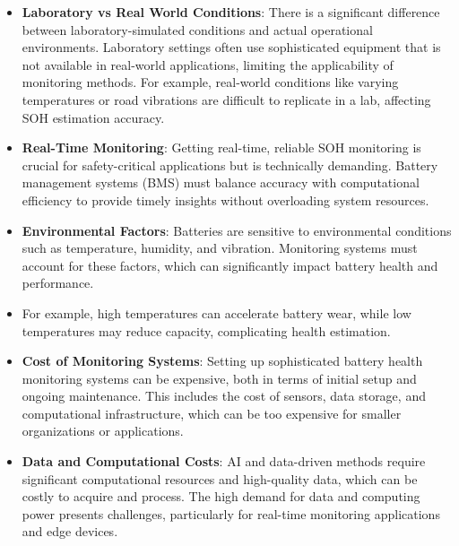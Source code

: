 \begin{itemize}
    \item \textbf{Laboratory vs Real World Conditions}: There is a significant difference between laboratory-simulated conditions and actual operational environments. Laboratory settings often use sophisticated equipment that is not available in real-world applications, limiting the applicability of monitoring methods. For example, real-world conditions like varying temperatures or road vibrations are difficult to replicate in a lab, affecting SOH estimation accuracy.
    \item \textbf{Real-Time Monitoring}: Getting real-time, reliable SOH monitoring is crucial for safety-critical applications but is technically demanding. Battery management systems (BMS) must balance accuracy with computational efficiency to provide timely insights without overloading system resources.
    \item \textbf{Environmental Factors}: Batteries are sensitive to environmental conditions such as temperature, humidity, and vibration. Monitoring systems must account for these factors, which can significantly impact battery health and performance.
    \item For example, high temperatures can accelerate battery wear, while low temperatures may reduce capacity, complicating health estimation.
    \item \textbf{Cost of Monitoring Systems}: Setting up sophisticated battery health monitoring systems can be expensive, both in terms of initial setup and ongoing maintenance. This includes the cost of sensors, data storage, and computational infrastructure, which can be too expensive for smaller organizations or applications.
    \item \textbf{Data and Computational Costs}: AI and data-driven methods require significant computational resources and high-quality data, which can be costly to acquire and process. The high demand for data and computing power presents challenges, particularly for real-time monitoring applications and edge devices.
\end{itemize}



